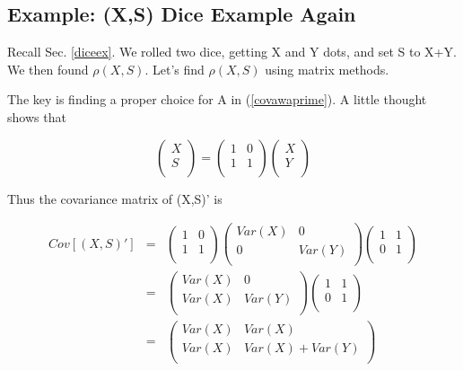 \subsection{Example: (X,S) Dice Example Again}

Recall Sec. \ref{diceex}.  We rolled two dice, getting X and Y dots, and
set S to X+Y.  We then found $\rho(X,S)$.  Let's find
$\rho(X,S)$ using matrix methods.

The key is finding a proper choice for A in (\ref{covawaprime}).  A
little thought shows that

\begin{equation}
   \left (
   \begin{array}{r}
   X \\
   S \\
   \end{array}
   \right )
   =
   \left (
   \begin{array}{rr}
   1 & 0 \\
   1 & 1 \\
   \end{array}
   \right )
   \left (
   \begin{array}{r}
   X \\
   Y \\
   \end{array}
   \right )
\end{equation}

Thus the covariance matrix of (X,S)' is

\begin{eqnarray}
Cov[(X,S)']&=& 
   \left (
   \begin{array}{rr}
   1 & 0 \\
   1 & 1 \\
   \end{array}
   \right )
   \left (
   \begin{array}{cc}
   Var(X) & 0 \\
   0 & Var(Y) \\
   \end{array}
   \right )
   \left (
   \begin{array}{rr}
   1 & 1 \\
   0 & 1 \\
   \end{array}
   \right ) \\
&=&
   \left (
   \begin{array}{cc}
   Var(X) & 0 \\
   Var(X) & Var(Y) \\
   \end{array}
   \right )
   \left (
   \begin{array}{rr}
   1 & 1 \\
   0 & 1 \\
   \end{array}
   \right ) \\ 
&=&
   \left (
   \begin{array}{cc}
   Var(X) & Var(X) \\
   Var(X) & Var(X) + Var(Y) \\
   \end{array}
   \right )
\end{eqnarray}

